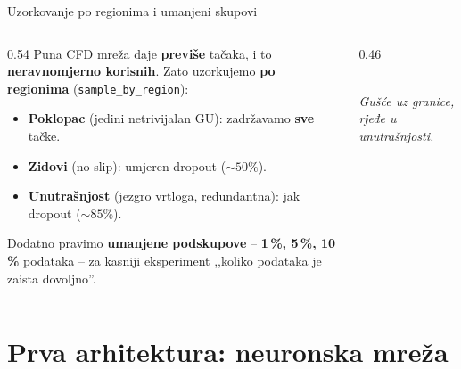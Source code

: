 \documentclass[10pt,aspectratio=169]{beamer}
\begin{document}
\begin{frame}{Uzorkovanje po regionima i umanjeni skupovi}
  \begin{columns}[T]
    \begin{column}{0.54\textwidth}
      \small
      Puna CFD mreža daje \textbf{previše} tačaka, i to \textbf{neravnomjerno korisnih}.
      Zato uzorkujemo \textbf{po regionima} (\texttt{sample\_by\_region}):
      \medskip
      \begin{itemize}
        \item \textbf{Poklopac} (jedini netrivijalan GU): zadržavamo \textbf{sve} tačke.
        \item \textbf{Zidovi} (no-slip): umjeren dropout ($\sim\!50\%$).
        \item \textbf{Unutrašnjost} (jezgro vrtloga, redundantna): jak dropout ($\sim\!85\%$).
      \end{itemize}
      \medskip
      Dodatno pravimo \textbf{umanjene podskupove} -- \textbf{1\,\%, 5\,\%, 10\,\%}
      podataka -- za kasniji eksperiment ,,koliko podataka je zaista dovoljno''.
    \end{column}
    \begin{column}{0.46\textwidth}
      \centering
      \\[1mm]
      {\scriptsize \emph{Gušće uz granice, rjeđe u unutrašnjosti.}}
    \end{column}
  \end{columns}
\end{frame}

\section{Prva arhitektura: neuronska mreža}
\end{document}
